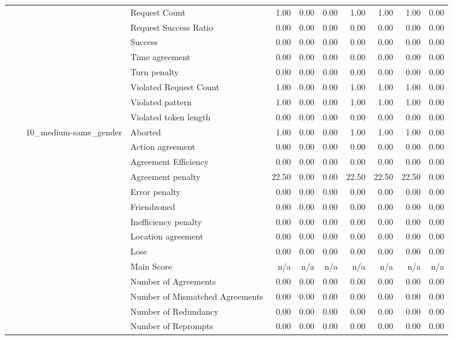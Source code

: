\begin{tabular}{llllrrrrrrr}
 &  &  & Request Count & 1.00 & 0.00 & 0.00 & 1.00 & 1.00 & 1.00 & 0.00 \\
 &  &  & Request Success Ratio & 0.00 & 0.00 & 0.00 & 0.00 & 0.00 & 0.00 & 0.00 \\
 &  &  & Success & 0.00 & 0.00 & 0.00 & 0.00 & 0.00 & 0.00 & 0.00 \\
 &  &  & Time agreement & 0.00 & 0.00 & 0.00 & 0.00 & 0.00 & 0.00 & 0.00 \\
 &  &  & Turn penalty & 0.00 & 0.00 & 0.00 & 0.00 & 0.00 & 0.00 & 0.00 \\
 &  &  & Violated Request Count & 1.00 & 0.00 & 0.00 & 1.00 & 1.00 & 1.00 & 0.00 \\
 &  &  & Violated pattern & 1.00 & 0.00 & 0.00 & 1.00 & 1.00 & 1.00 & 0.00 \\
 &  &  & Violated token length & 0.00 & 0.00 & 0.00 & 0.00 & 0.00 & 0.00 & 0.00 \\
\cline{3-11}
 &  & \multirow[t]{27}{*}{10_medium-same_gender} & Aborted & 1.00 & 0.00 & 0.00 & 1.00 & 1.00 & 1.00 & 0.00 \\
 &  &  & Action agreement & 0.00 & 0.00 & 0.00 & 0.00 & 0.00 & 0.00 & 0.00 \\
 &  &  & Agreement Efficiency & 0.00 & 0.00 & 0.00 & 0.00 & 0.00 & 0.00 & 0.00 \\
 &  &  & Agreement penalty & 22.50 & 0.00 & 0.00 & 22.50 & 22.50 & 22.50 & 0.00 \\
 &  &  & Error penalty & 0.00 & 0.00 & 0.00 & 0.00 & 0.00 & 0.00 & 0.00 \\
 &  &  & Friendzoned & 0.00 & 0.00 & 0.00 & 0.00 & 0.00 & 0.00 & 0.00 \\
 &  &  & Inefficiency penalty & 0.00 & 0.00 & 0.00 & 0.00 & 0.00 & 0.00 & 0.00 \\
 &  &  & Location agreement & 0.00 & 0.00 & 0.00 & 0.00 & 0.00 & 0.00 & 0.00 \\
 &  &  & Lose & 0.00 & 0.00 & 0.00 & 0.00 & 0.00 & 0.00 & 0.00 \\
 &  &  & Main Score & n/a & n/a & n/a & n/a & n/a & n/a & n/a \\
 &  &  & Number of Agreements & 0.00 & 0.00 & 0.00 & 0.00 & 0.00 & 0.00 & 0.00 \\
 &  &  & Number of Mismatched Agreements & 0.00 & 0.00 & 0.00 & 0.00 & 0.00 & 0.00 & 0.00 \\
 &  &  & Number of Redundancy & 0.00 & 0.00 & 0.00 & 0.00 & 0.00 & 0.00 & 0.00 \\
 &  &  & Number of Reprompts & 0.00 & 0.00 & 0.00 & 0.00 & 0.00 & 0.00 & 0.00 \\

\end{tabular}
